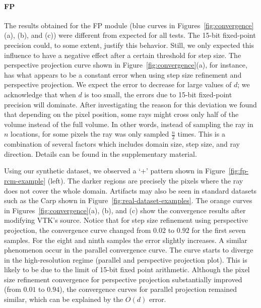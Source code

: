 \paragraph*{FP}
The results obtained for the FP module (blue curves in
Figures~\ref{fig:convergence}(a), (b), and (c)) were different from
expected for all tests. The 15-bit fixed-point precision could, to
some extent, justify this behavior. Still, we only expected this
influence to have a negative effect after a certain threshold for step
size. The perspective projection curve shown in
Figure~\ref{fig:convergence}(a), for instance, has what appears to be
a constant error when using step size refinement and perspective
projection. We expect the error to decrease for large values of $d$;
we acknowledge that when $d$ is too small, the errors due to 15-bit fixed-point
precision will dominate.
After investigating the reason for this deviation we found that
depending on the pixel position, some rays might cross only half of
the volume instead of the full volume. In other words, instead of
sampling the ray in $n$ locations, for some pixels the ray was only
sampled $\frac{n}{2}$ times. This is a combination of several factors
which includes domain size, step size, and ray direction. Details 
can be found in the supplementary material.

Using our synthetic dataset, we observed a `+' pattern shown in
Figure~\ref{fig:fp-rcm-example} (left). The darker regions are
precisely the pixels where the ray does not cover the whole
domain. Artifacts may also be seen in standard datasets such as the
Carp shown in Figure~\ref{fig:real-dataset-examples}.  The orange
curves in Figures~\ref{fig:convergence}(a), (b), and (c) show the
convergence results after modifying VTK's source.  Notice that for
step size refinement using perspective projection, the convergence
curve changed from $0.02$ to $0.92$ for the first seven samples. For the eight 
and ninth samples the error slightly increases. A similar phenomenon occur
in the parallel convergence curve. The curve starts to
diverge in the high-resolution regime (parallel and perspective projection plot).
This is likely to be due to the limit of 15-bit fixed point arithmetic.  Although 
the  pixel size refinement convergence for perspective projection substantially improved 
(from $0.01$ to $0.94$), the convergence curves for parallel projection remained similar, 
which can be explained by the $O(d)$ error.

